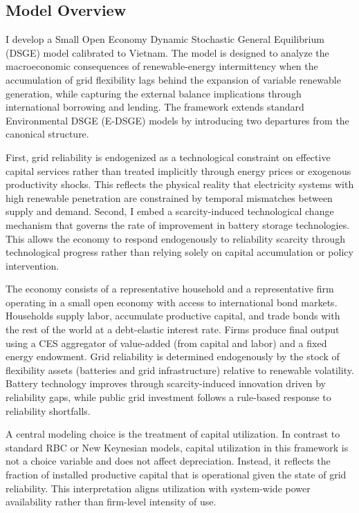 	\subsection{Model Overview}
	
	I develop a Small Open Economy Dynamic Stochastic General Equilibrium (DSGE) model calibrated to Vietnam. The model is designed to analyze the macroeconomic consequences of renewable-energy intermittency when the accumulation of grid flexibility lags behind the expansion of variable renewable generation, while capturing the external balance implications through international borrowing and lending. The framework extends standard Environmental DSGE (E-DSGE) models by introducing two departures from the canonical structure.
	
	First, grid reliability is endogenized as a technological constraint on effective capital services rather than treated implicitly through energy prices or exogenous productivity shocks. This reflects the physical reality that electricity systems with high renewable penetration are constrained by temporal mismatches between supply and demand. Second, I embed a scarcity-induced technological change mechanism that governs the rate of improvement in battery storage technologies. This allows the economy to respond endogenously to reliability scarcity through technological progress rather than relying solely on capital accumulation or policy intervention.
	
	The economy consists of a representative household and a representative firm operating in a small open economy with access to international bond markets. Households supply labor, accumulate productive capital, and trade bonds with the rest of the world at a debt-elastic interest rate. Firms produce final output using a CES aggregator of value-added (from capital and labor) and a fixed energy endowment. Grid reliability is determined endogenously by the stock of flexibility assets (batteries and grid infrastructure) relative to renewable volatility. Battery technology improves through scarcity-induced innovation driven by reliability gaps, while public grid investment follows a rule-based response to reliability shortfalls.
	
	A central modeling choice is the treatment of capital utilization. In contrast to standard RBC or New Keynesian models, capital utilization in this framework is not a choice variable and does not affect depreciation. Instead, it reflects the fraction of installed productive capital that is operational given the state of grid reliability. This interpretation aligns utilization with system-wide power availability rather than firm-level intensity of use.
	
